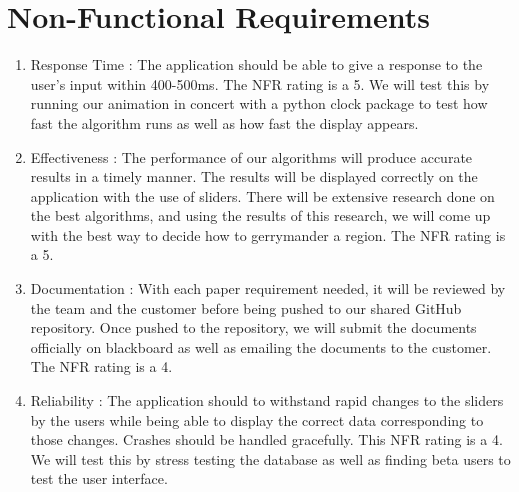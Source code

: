 \documentclass{article}
\begin{document}
\begin{addmargin}[4em]{0em}

\end{addmargin}

\vspace{2.5mm}


\section{Non-Functional Requirements}\label{sec:non-functionalReq}

\vspace{2.5mm}

\begin{addmargin}[2em]{0em}
\begin{enumerate}

\item Response Time : The application should be able to give a response to the user's input within 400-500ms. The NFR rating is a 5. We will test this by running our animation in concert with a python clock package to test how fast the algorithm runs as well as how fast the display appears.

\item Effectiveness : The performance of our algorithms will produce accurate results in a timely manner. The results will be displayed correctly on the application with the use of sliders. There will be extensive research done on the best algorithms, and using the results of this research, we will come up with the best way to decide how to gerrymander a region. The NFR rating is a 5.

\item Documentation : With each paper requirement needed, it will be reviewed by the team and the customer before being pushed to our shared GitHub repository. Once pushed to the repository, we will submit the documents officially on blackboard as well as emailing the documents to the customer. The NFR rating is a 4. 

\item Reliability : The application should to withstand rapid changes to the sliders by the users while being able to display the correct data corresponding to those changes. Crashes should be handled gracefully. This NFR rating is a 4. We will test this by stress testing the database as well as finding beta users to test the user interface.


\end{enumerate}
\end{addmargin}
\end{document}
